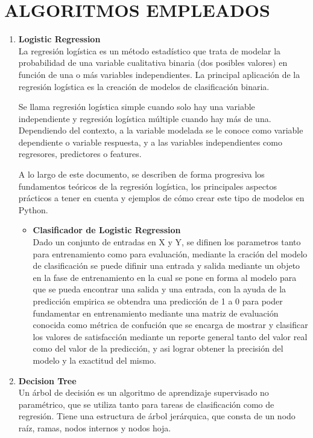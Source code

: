 \documentclass[letterpaper]{article}
\begin{document}
\section{ALGORITMOS EMPLEADOS}
\begin{enumerate}
\item 
\textbf{Logistic Regression}  
\\La regresión logística es un método estadístico que trata de modelar la probabilidad de una variable cualitativa binaria (dos posibles valores) en función de una o más variables independientes. La principal aplicación de la regresión logística es la creación de modelos de clasificación binaria.

Se llama regresión logística simple cuando solo hay una variable independiente y regresión logística múltiple cuando hay más de una. Dependiendo del contexto, a la variable modelada se le conoce como variable dependiente o variable respuesta, y a las variables independientes como regresores, predictores o features.

A lo largo de este documento, se describen de forma progresiva los fundamentos teóricos de la regresión logística, los principales aspectos prácticos a tener en cuenta y ejemplos de cómo crear este tipo de modelos en Python.
\begin{itemize}
    \item 
    \textbf{Clasificador de Logistic Regression}
    \\Dado un conjunto de entradas en X y Y, se difinen los parametros tanto para entrenamiento como para evaluación, mediante la cración del modelo de clasificación se puede difinir una entrada y salida mediante un objeto en la fase de entrenamiento en la cual se pone en forma al modelo para que se pueda encontrar una salida y una entrada, con la ayuda de la predicción empirica se obtendra una predicción de 1 a 0 para poder fundamentar en entrenamiento mediante una matriz de evaluación conocida como métrica de confución que se encarga de mostrar y clasificar los valores de satisfacción mediante un reporte general tanto del valor real como del valor de la predicción, y asi lograr obtener la precisión del modelo y la exactitud del mismo.  
\end{itemize}
\item 
\textbf{Decision Tree} 
\\Un árbol de decisión es un algoritmo de aprendizaje supervisado no paramétrico, que se utiliza tanto para tareas de clasificación como de regresión. Tiene una estructura de árbol jerárquica, que consta de un nodo raíz, ramas, nodos internos y nodos hoja.


\end{enumerate}
\end{document}
